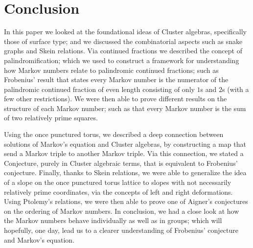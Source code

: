 \documentclass[12pt,vu]{adammath}
\theoremstyle{theorem}
\theoremstyle{corollary}
\theoremstyle{conjecture}
\theoremstyle{proposition}
\theoremstyle{definition}
\theoremstyle{remark}
\begin{document}
\chapter{Conclusion}
In this paper we looked at the foundational ideas of Cluster algebras, specifically those of surface type; and we discussed the combinatorial aspects such as snake graphs and Skein relations. Via continued fractions we described the concept of palindromification; which we used to construct a framework for understanding how Markov numbers relate to palindromic continued fractions; such as Frobenius' result that states every Markov number is the numerator of the palindromic continued fraction of even length consisting of only $1$s and $2$s (with a few other restrictions). We were then able to prove different results on the structure of each Markov number; such as that every Markov number is the sum of two relatively prime squares. 

Using the once punctured torus, we described a deep connection between solutions of Markov's equation and Cluster algebras, by constructing a map that send a Markov triple to another Markov triple. Via this connection, we stated a Conjecture, purely in Cluster algebraic terms, that is equivalent to Frobenius' conjecture. Finally, thanks to Skein relations, we were able to generalize the idea of a slope on the once punctured torus lattice to slopes with not necessarily relatively prime coordinates, via the concepts of left and right deformations. Using Ptolemy's relations, we were then able to prove one of Aigner's conjectures on the ordering of Markov numbers. In conclusion, we had a close look at how the Markov numbers behave individually as well as in groups; which will hopefully, one day, lead us to a clearer understanding of Frobenius' conjecture and Markov's equation. 
 
\printbibliography
\end{document}
